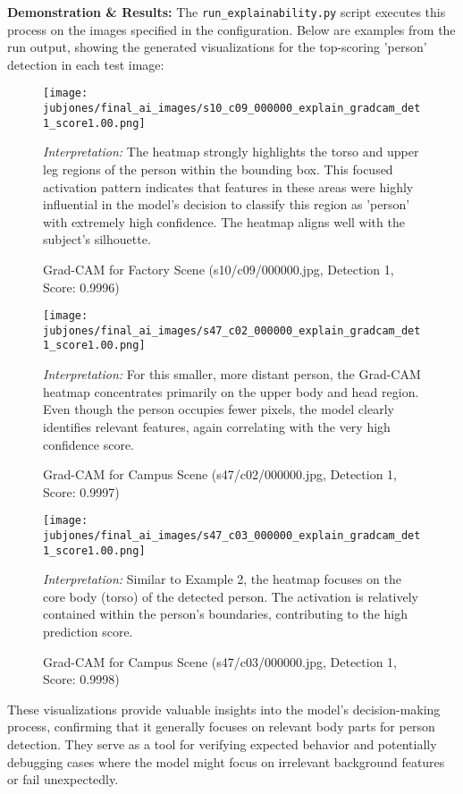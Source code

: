 \textbf{Demonstration \& Results:}
The \texttt{run\_explainability.py} script executes this process on the images specified in the configuration. Below are examples from the run output, showing the generated visualizations for the top-scoring 'person' detection in each test image:

\begin{figure}[!htb]
    \centering
    \texttt{[image: jubjones/final\_ai\_images/s10\_c09\_000000\_explain\_gradcam\_det1\_score1.00.png]}
    \caption{Grad-CAM for Factory Scene (s10/c09/000000.jpg, Detection 1, Score: 0.9996)}
    \label{fig:gradcam_example1}
    \parbox{0.9\textwidth}{\footnotesize \textit{Interpretation:} The heatmap strongly highlights the torso and upper leg regions of the person within the bounding box. This focused activation pattern indicates that features in these areas were highly influential in the model's decision to classify this region as 'person' with extremely high confidence. The heatmap aligns well with the subject's silhouette.}
\end{figure}

\begin{figure}[!htb]
    \centering
    \texttt{[image: jubjones/final\_ai\_images/s47\_c02\_000000\_explain\_gradcam\_det1\_score1.00.png]}
    \caption{Grad-CAM for Campus Scene (s47/c02/000000.jpg, Detection 1, Score: 0.9997)}
    \label{fig:gradcam_example2}
    \parbox{0.9\textwidth}{\footnotesize \textit{Interpretation:} For this smaller, more distant person, the Grad-CAM heatmap concentrates primarily on the upper body and head region. Even though the person occupies fewer pixels, the model clearly identifies relevant features, again correlating with the very high confidence score.}
\end{figure}

\begin{figure}[!htb]
    \centering
    \texttt{[image: jubjones/final\_ai\_images/s47\_c03\_000000\_explain\_gradcam\_det1\_score1.00.png]}
    \caption{Grad-CAM for Campus Scene (s47/c03/000000.jpg, Detection 1, Score: 0.9998)}
    \label{fig:gradcam_example3}
    \parbox{0.9\textwidth}{\footnotesize \textit{Interpretation:} Similar to Example 2, the heatmap focuses on the core body (torso) of the detected person. The activation is relatively contained within the person's boundaries, contributing to the high prediction score.}
\end{figure}
\clearpage
These visualizations provide valuable insights into the model's decision-making process, confirming that it generally focuses on relevant body parts for person detection. They serve as a tool for verifying expected behavior and potentially debugging cases where the model might focus on irrelevant background features or fail unexpectedly.

